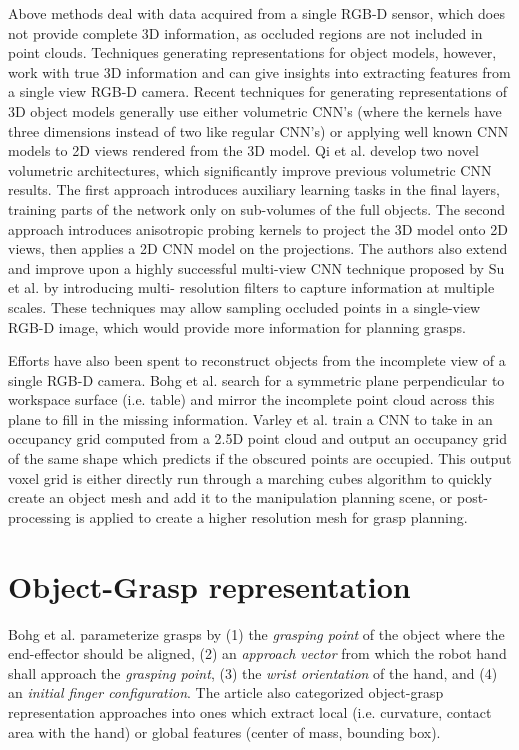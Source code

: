 Above methods deal with data acquired from a single RGB-D sensor, which does not provide complete 3D information, as
occluded regions are not included in point clouds. Techniques generating representations for object models, however,
work with true 3D information and can give insights into extracting features from a single view RGB-D camera. Recent
techniques for generating representations of 3D object models generally use either volumetric CNN's (where the kernels
have three dimensions instead of two like regular CNN's) or applying well known CNN models to 2D views rendered from the
3D model. Qi et al. \cite{Qi2016} develop two novel volumetric architectures, which significantly improve previous
volumetric CNN results. The first approach introduces auxiliary learning tasks in the final layers, training parts of
the network only on sub-volumes of the full objects. The second approach introduces anisotropic probing kernels to
project the 3D model onto 2D views, then applies a 2D CNN model on the projections. The authors also extend and improve
upon a highly successful multi-view CNN technique proposed by Su et al. \cite{Su2015} by introducing multi-
resolution filters to capture information at multiple scales. These techniques may allow sampling occluded points in a
single-view RGB-D image, which would provide more information for planning grasps.

Efforts have also been spent to reconstruct objects from the incomplete view of a single RGB-D camera. Bohg et al.
\cite{Bohg2011MindTheGap} search for a symmetric plane perpendicular to workspace surface (i.e. table) and mirror
the incomplete point cloud across this plane to fill in the missing information. Varley et al. \cite{Varley2017}
train a CNN to take in an occupancy grid computed from a 2.5D point cloud and output an occupancy grid of the same shape
which predicts if the obscured points are occupied. This output voxel grid is either directly run through a marching
cubes algorithm to quickly create an object mesh and add it to the manipulation planning scene, or post-processing
is applied to create a higher resolution mesh for grasp planning.


\section{Object-Grasp representation}
Bohg et al. \cite{Bohg2014} parameterize grasps by (1) the \emph{grasping point} of the object where the end-effector
should be aligned, (2) an \emph{approach vector} from which the robot hand shall approach the \emph{grasping point},
(3) the \emph{wrist orientation} of the hand, and (4) an \emph{initial finger configuration}. The article also
categorized object-grasp representation approaches into ones which extract local (i.e. curvature, contact area with the
hand) or global features (center of mass, bounding box).

